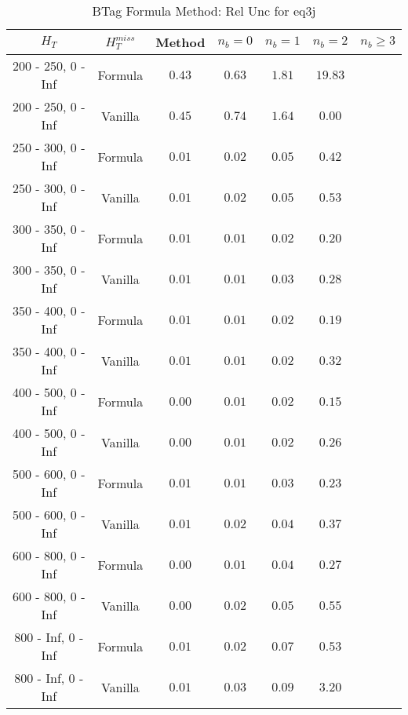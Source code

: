 \begin{longtable}{ | c | c | c | c | c | c | c | }
\caption{BTag Formula Method: Rel Unc for eq3j} \label{tab:eq3j} \\    \hline 
$H_{T}$ & $H_{T}^{miss}$ & Method & $n_{b} = 0$ & $n_{b} = 1$ & $n_{b} = 2$ & $n_{b} \ge 3$ \\ \hline 200 -  250,    0 -  Inf & Formula  & $  0.43 $ & $  0.63 $ & $  1.81 $ & $ 19.83 $  \\  
 200 -  250,    0 -  Inf & Vanilla  & $  0.45 $ & $  0.74 $ & $  1.64 $ & $  0.00 $  \\ \hline 
 250 -  300,    0 -  Inf & Formula  & $  0.01 $ & $  0.02 $ & $  0.05 $ & $  0.42 $  \\  
 250 -  300,    0 -  Inf & Vanilla  & $  0.01 $ & $  0.02 $ & $  0.05 $ & $  0.53 $  \\ \hline 
 300 -  350,    0 -  Inf & Formula  & $  0.01 $ & $  0.01 $ & $  0.02 $ & $  0.20 $  \\  
 300 -  350,    0 -  Inf & Vanilla  & $  0.01 $ & $  0.01 $ & $  0.03 $ & $  0.28 $  \\ \hline 
 350 -  400,    0 -  Inf & Formula  & $  0.01 $ & $  0.01 $ & $  0.02 $ & $  0.19 $  \\  
 350 -  400,    0 -  Inf & Vanilla  & $  0.01 $ & $  0.01 $ & $  0.02 $ & $  0.32 $  \\ \hline 
 400 -  500,    0 -  Inf & Formula  & $  0.00 $ & $  0.01 $ & $  0.02 $ & $  0.15 $  \\  
 400 -  500,    0 -  Inf & Vanilla  & $  0.00 $ & $  0.01 $ & $  0.02 $ & $  0.26 $  \\ \hline 
 500 -  600,    0 -  Inf & Formula  & $  0.01 $ & $  0.01 $ & $  0.03 $ & $  0.23 $  \\  
 500 -  600,    0 -  Inf & Vanilla  & $  0.01 $ & $  0.02 $ & $  0.04 $ & $  0.37 $  \\ \hline 
 600 -  800,    0 -  Inf & Formula  & $  0.00 $ & $  0.01 $ & $  0.04 $ & $  0.27 $  \\  
 600 -  800,    0 -  Inf & Vanilla  & $  0.00 $ & $  0.02 $ & $  0.05 $ & $  0.55 $  \\ \hline 
 800 -  Inf,    0 -  Inf & Formula  & $  0.01 $ & $  0.02 $ & $  0.07 $ & $  0.53 $  \\  
 800 -  Inf,    0 -  Inf & Vanilla  & $  0.01 $ & $  0.03 $ & $  0.09 $ & $  3.20 $  \\ \hline 
    \hline 
    \hline 
\end{longtable}
